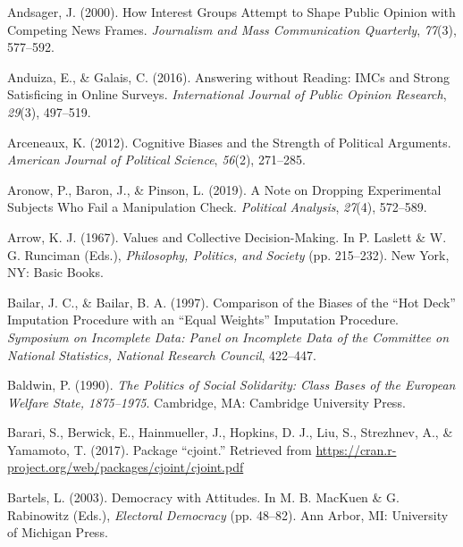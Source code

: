 \documentclass[12pt,econ]{sources/authesis}
\newenvironment{CSLReferences}%
  {}%
  {\par}
\begin{document}
\begin{CSLReferences}{1}{0}
\leavevmode{}%
Andsager, J. (2000). How {Interest} {Groups} {Attempt} to {Shape} {Public} {Opinion} with {Competing} {News} {Frames}. \emph{Journalism and Mass Communication Quarterly}, \emph{77}(3), 577--592.

\leavevmode{}%
Anduiza, E., \& Galais, C. (2016). {Answering without Reading: IMCs and Strong Satisficing in Online Surveys}. \emph{International Journal of Public Opinion Research}, \emph{29}(3), 497--519.

\leavevmode{}%
Arceneaux, K. (2012). Cognitive {Biases} and the {Strength} of {Political} {Arguments}. \emph{American Journal of Political Science}, \emph{56}(2), 271--285.

\leavevmode{}%
Aronow, P., Baron, J., \& Pinson, L. (2019). {A Note on Dropping Experimental Subjects Who Fail a Manipulation Check}. \emph{Political Analysis}, \emph{27}(4), 572--589.

\leavevmode{}%
Arrow, K. J. (1967). {Values and Collective Decision-Making}. In P. Laslett \& W. G. Runciman (Eds.), \emph{{Philosophy, Politics, and Society}} (pp. 215--232). New York, NY: Basic Books.

\leavevmode{}%
Bailar, J. C., \& Bailar, B. A. (1997). {Comparison of the Biases of the {``Hot Deck''} Imputation Procedure with an {``Equal Weights''} Imputation Procedure}. \emph{Symposium on Incomplete Data: Panel on Incomplete Data of the Committee on National Statistics, National Research Council}, 422--447.

\leavevmode{}%
Baldwin, P. (1990). \emph{{The Politics of Social Solidarity: Class Bases of the European Welfare State, 1875--1975}}. Cambridge, MA: Cambridge University Press.

\leavevmode{}%
Barari, S., Berwick, E., Hainmueller, J., Hopkins, D. J., Liu, S., Strezhnev, A., \& Yamamoto, T. (2017). Package {``cjoint.''} Retrieved from \url{https://cran.r-project.org/web/packages/cjoint/cjoint.pdf}

\leavevmode{}%
Bartels, L. (2003). {Democracy with Attitudes}. In M. B. MacKuen \& G. Rabinowitz (Eds.), \emph{{Electoral Democracy}} (pp. 48--82). Ann Arbor, MI: University of Michigan Press.


\end{CSLReferences}
\end{document}
